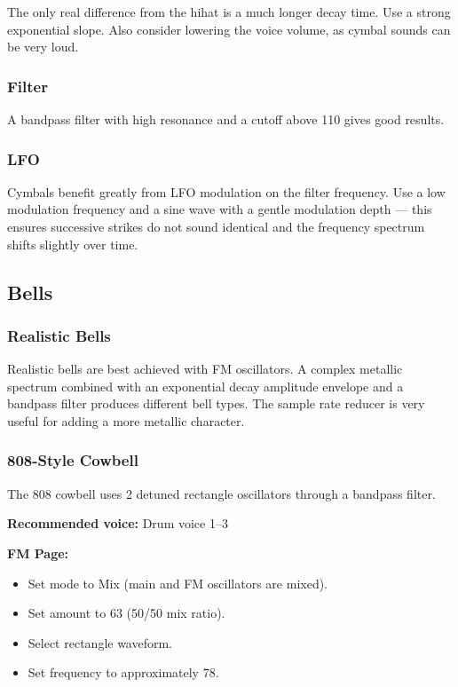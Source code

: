 The only real difference from the hihat is a much longer decay time. Use
a strong exponential slope. Also consider lowering the voice volume, as
cymbal sounds can be very loud.

\subsubsection{Filter}\label{filter-2}

A bandpass filter with high resonance and a cutoff above 110 gives good
results.

\subsubsection{LFO}\label{lfo}

Cymbals benefit greatly from LFO modulation on the filter frequency. Use
a low modulation frequency and a sine wave with a gentle modulation
depth --- this ensures successive strikes do not sound identical and the
frequency spectrum shifts slightly over time.

\subsection{Bells}\label{bells}

\subsubsection{Realistic Bells}\label{realistic-bells}

Realistic bells are best achieved with FM oscillators. A complex
metallic spectrum combined with an exponential decay amplitude envelope
and a bandpass filter produces different bell types. The sample rate
reducer is very useful for adding a more metallic character.

\subsubsection{808-Style Cowbell}\label{style-cowbell}

The 808 cowbell uses 2 detuned rectangle oscillators through a bandpass
filter.

\textbf{Recommended voice:} Drum voice 1--3

\textbf{FM Page:}

\begin{itemize}
\tightlist
\item
  Set mode to Mix (main and FM oscillators are mixed).
\item
  Set amount to 63 (50/50 mix ratio).
\item
  Select rectangle waveform.
\item
  Set frequency to approximately 78.
\end{itemize}

